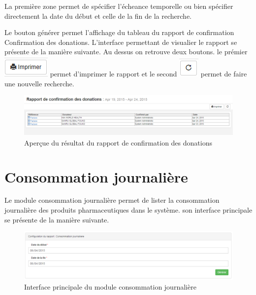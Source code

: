 \documentclass[12pt,a4paper]{report}
\begin{document}
La première zone permet de spécifier l'écheance temporelle  ou bien spécifier directement la date du début et celle de la fin de la recherche. 

Le bouton générer permet l'affichage du tableau du rapport de confirmation Confirmation des donations. L'interface permettant de visualier le rapport se présente de la manière suivante. Au dessus on retrouve deux boutons. le prémier 
\includegraphics[scale=0.7]{pic/Print.png} permet d'imprimer le rapport et le second \includegraphics[scale=0.7]{pic/refresh.png} permet de faire une nouvelle recherche.

\begin{figure}[h]
\begin{center}
\includegraphics[width=12cm]{pic/RapConfDon.png}
\end{center}
\caption{Aperçue du résultat du rapport de confirmation des donations}
\label{Aperçue du résultat du rapport de confirmation des donations}
\end{figure}

\newpage
\section{Consommation journalière}
Le module consommation journalière permet de lister la consommation journalière des produits pharmaceutiques dans le système.
son interface principale se présente de la manière suivante.

\begin{figure}[h]
\begin{center}
\includegraphics[width=14cm]{pic/ConsJour.png}
\end{center}
\caption{Interface principale du module consommation journalière}
\label{Interface principale du module consommation journalière}
\end{figure}
\end{document}
